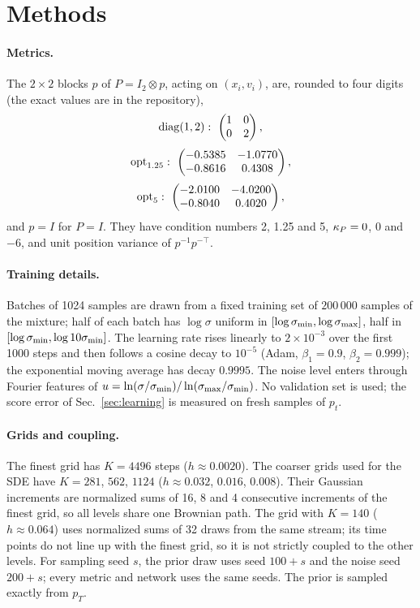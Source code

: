 \section{Methods}
\label{app:methods}

\paragraph*{Metrics.}
The $2\times2$ blocks $p$ of $P=I_2\otimes p$, acting on $(x_i,v_i)$, are, rounded to four digits (the exact values are in the repository),
\begin{equation*}
\dtwo:\ \begin{pmatrix}1&0\\0&2\end{pmatrix},
\end{equation*}
\begin{equation*}
\optc{1.25}:\ \begin{pmatrix}-0.5385&-1.0770\\-0.8616&0.4308\end{pmatrix},
\end{equation*}
\begin{equation*}
\optc{5}:\ \begin{pmatrix}-2.0100&-4.0200\\-0.8040&0.4020\end{pmatrix},
\end{equation*}
and $p=I$ for $P=I$.
They have condition numbers 2, 1.25 and 5, $\kappa_P=0$, $0$ and $-6$, and unit position variance of $p^{-1}p^{-\top}$.

\paragraph*{Training details.}
Batches of 1024 samples are drawn from a fixed training set of $200\,000$ samples of the mixture; half of each batch has $\log\sigma$ uniform in $[\log\sigma_{\min},\log\sigma_{\max}]$, half in $[\log\sigma_{\min},\log 10\sigma_{\min}]$.
The learning rate rises linearly to $2\times10^{-3}$ over the first 1000 steps and then follows a cosine decay to $10^{-5}$ (Adam, $\beta_1=0.9$, $\beta_2=0.999$); the exponential moving average has decay $0.9995$.
The noise level enters through Fourier features of $u=\ln(\sigma/\sigma_{\min})/\ln(\sigma_{\max}/\sigma_{\min})$.
No validation set is used; the score error of Sec.~\ref{sec:learning} is measured on fresh samples of $p_t$.

\paragraph*{Grids and coupling.}
The finest grid has $K=4496$ steps ($h\approx0.0020$).
The coarser grids used for the SDE have $K=281$, $562$, $1124$ ($h\approx0.032$, $0.016$, $0.008$).
Their Gaussian increments are normalized sums of 16, 8 and 4 consecutive increments of the finest grid, so all levels share one Brownian path.
The grid with $K=140$ ($h\approx0.064$) uses normalized sums of 32 draws from the same stream; its time points do not line up with the finest grid, so it is not strictly coupled to the other levels.
For sampling seed $s$, the prior draw uses seed $100+s$ and the noise seed $200+s$; every metric and network uses the same seeds.
The prior is sampled exactly from $p_T$.

